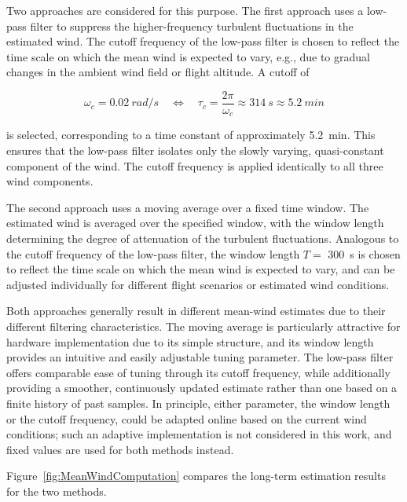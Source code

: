 Two approaches are considered for this purpose. The first approach uses a low-pass filter to suppress the higher-frequency turbulent fluctuations in the estimated wind. The cutoff frequency of the low-pass filter is chosen to reflect the time scale on which the mean wind is expected to vary, e.g., due to gradual changes in the ambient wind field or flight altitude. A cutoff of

\begin{equation}
	\omega_c = \SI{0.02}{rad/s}
	\quad \Leftrightarrow \quad
	\tau_c = \frac{2\pi}{\omega_c} \approx \SI{314}{s} \approx \SI{5.2}{min}
\end{equation}

is selected, corresponding to a time constant of approximately \SI{5.2}{min}. This ensures that the low-pass filter isolates only the slowly varying, quasi-constant component of the wind. The cutoff frequency is applied identically to all three wind components.

The second approach uses a moving average over a fixed time window. The estimated wind is averaged over the specified window, with the window length determining the degree of attenuation of the turbulent fluctuations. Analogous to the cutoff frequency of the low-pass filter, the window length $T =$ \SI{300}{s} is chosen to reflect the time scale on which the mean wind is expected to vary, and can be adjusted individually for different flight scenarios or estimated wind conditions.

Both approaches generally result in different mean-wind estimates due to their different filtering characteristics. The moving average is particularly attractive for hardware implementation due to its simple structure, and its window length provides an intuitive and easily adjustable tuning parameter. The low-pass filter offers comparable ease of tuning through its cutoff frequency, while additionally providing a smoother, continuously updated estimate rather than one based on a finite history of past samples. In principle, either parameter, the window length or the cutoff frequency, could be adapted online based on the current wind conditions; such an adaptive implementation is not considered in this work, and fixed values are used for both methods instead.

Figure~\ref{fig:MeanWindComputation} compares the long-term estimation results for the two methods.

